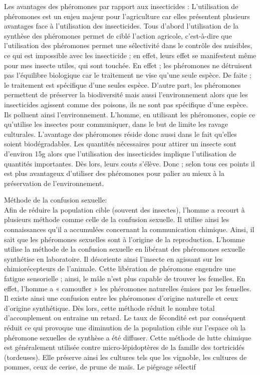 Les avantages des phéromones par rapport aux insecticides :
L'utilisation de phéromones est un enjeu majeur pour l'agriculture car
elles présentent plusieurs avantages face à l'utilisation des
insecticides. Tous d'abord l'utilisation de la synthèse des phéromones
permet de ciblé l'action agricole, c'est-à-dire que l'utilisation des
phéromones permet une sélectivité dans le contrôle des nuisibles, ce qui
est impossible avec les insecticide ; en effet, leurs effet se
manifestent même pour mes insecte utiles, qui sont touchée. En effet ;
les phéromones ne détruisent pas l'équilibre biologique car le
traitement ne vise qu'une seule espèce. De faite ; le traitement est
spécifique d'une seules espèce. D'autre part, les phéromones permettent
de préserver la biodiversité mais aussi l'environnement alors que les
insecticides agissent comme des poisons, ils ne sont pas spécifique
d'une espèce. Ils polluent ainsi l'environnement. L'homme, en utilisant
les phéromones, copie ce qu'utilise les insectes pour communiquer, dans
le but de limite les ravage culturales. L'avantage des phéromones réside
donc aussi dans le fait qu'elles soient biodégradables. Les quantités
nécessaires pour attirer un insecte sont d'environ 15g alors que
l'utilisation des insecticides implique l'utilisation de quantités
importantes. Dès lors, leurs couts s'élève. Donc ; selon tous ces points
il est plus avantageux d'utiliser des phéromones pour palier au mieux à
la préservation de l'environnement.

Méthode de la confusion sexuelle:\\Afin de réduire la population cible
(souvent des insectes), l'homme a recourt à plusieurs méthode comme
celle de la confusion sexuelle. Il utilise ainsi les connaissances qu'il
a accumulées concernant la communication chimique. Ainsi, il sait que
les phéromones sexuelles sont à l'origine de la reproduction. L'homme
utilise la méthode de la confusion sexuelle en libérant des phéromones
sexuelle synthétise en laboratoire. Il désoriente ainsi l'insecte en
agissant sur les chimiorécepteurs de l'animale. Cette libération de
phéromone engendre une fatigue sensorielle ; ainsi, le mâle n'est plus
capable de trouver les femelles. En effet, l'homme a « camoufler » les
phéromones naturelles émises par les femelles. Il existe ainsi une
confusion entre les phéromones d'origine naturelle et ceux d'origine
synthétique. Dès lors, cette méthode réduit le nombre total
d'accouplement ou entraine un retard. Le taux de fécondité est par
conséquent réduit ce qui provoque une diminution de la population cible
sur l'espace où la phéromone sexuelles de synthèse a été diffuser. Cette
méthode de lutte chimique est généralement utilisée contre
micro-lépidoptères de la famille des tortricidés (tordeuses). Elle
préserve ainsi les cultures tels que les vignoble, les cultures de
pommes, ceux de cerise, de prune de maïs. Le piégeage sélectif


